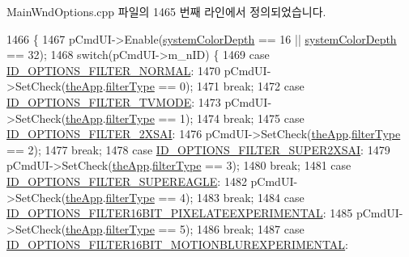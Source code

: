 Main\+Wnd\+Options.\+cpp 파일의 1465 번째 라인에서 정의되었습니다.


\begin{DoxyCode}
1466 \{
1467   pCmdUI->Enable(\mbox{\hyperlink{system_8cpp_adaf454a4617a00b5cfed14c203ab6efa}{systemColorDepth}} == 16 || \mbox{\hyperlink{system_8cpp_adaf454a4617a00b5cfed14c203ab6efa}{systemColorDepth}} == 32);
1468   \textcolor{keywordflow}{switch}(pCmdUI->m\_nID) \{
1469   \textcolor{keywordflow}{case} \mbox{\hyperlink{resource_8h_a25dffe1863840876df4f1a6115356a9a}{ID\_OPTIONS\_FILTER\_NORMAL}}:
1470     pCmdUI->SetCheck(\mbox{\hyperlink{_v_b_a_8cpp_a8095a9d06b37a7efe3723f3218ad8fb3}{theApp}}.\mbox{\hyperlink{class_v_b_a_a835f54f74420b21459e0f3ce0eacc20d}{filterType}} == 0);
1471     \textcolor{keywordflow}{break};
1472   \textcolor{keywordflow}{case} \mbox{\hyperlink{resource_8h_a16010f346f94112a47abf20452339c56}{ID\_OPTIONS\_FILTER\_TVMODE}}:
1473     pCmdUI->SetCheck(\mbox{\hyperlink{_v_b_a_8cpp_a8095a9d06b37a7efe3723f3218ad8fb3}{theApp}}.\mbox{\hyperlink{class_v_b_a_a835f54f74420b21459e0f3ce0eacc20d}{filterType}} == 1);
1474     \textcolor{keywordflow}{break};
1475   \textcolor{keywordflow}{case} \mbox{\hyperlink{resource_8h_a071863ea5c811c0e06f114a82a0dadab}{ID\_OPTIONS\_FILTER\_2XSAI}}:
1476     pCmdUI->SetCheck(\mbox{\hyperlink{_v_b_a_8cpp_a8095a9d06b37a7efe3723f3218ad8fb3}{theApp}}.\mbox{\hyperlink{class_v_b_a_a835f54f74420b21459e0f3ce0eacc20d}{filterType}} == 2);
1477     \textcolor{keywordflow}{break};
1478   \textcolor{keywordflow}{case} \mbox{\hyperlink{resource_8h_a86cc1c19f8454ac2cf99950637d3591f}{ID\_OPTIONS\_FILTER\_SUPER2XSAI}}:
1479     pCmdUI->SetCheck(\mbox{\hyperlink{_v_b_a_8cpp_a8095a9d06b37a7efe3723f3218ad8fb3}{theApp}}.\mbox{\hyperlink{class_v_b_a_a835f54f74420b21459e0f3ce0eacc20d}{filterType}} == 3);
1480     \textcolor{keywordflow}{break};
1481   \textcolor{keywordflow}{case} \mbox{\hyperlink{resource_8h_ad67d0cc174b31d83f60c7015545b3d52}{ID\_OPTIONS\_FILTER\_SUPEREAGLE}}:
1482     pCmdUI->SetCheck(\mbox{\hyperlink{_v_b_a_8cpp_a8095a9d06b37a7efe3723f3218ad8fb3}{theApp}}.\mbox{\hyperlink{class_v_b_a_a835f54f74420b21459e0f3ce0eacc20d}{filterType}} == 4);
1483     \textcolor{keywordflow}{break};
1484   \textcolor{keywordflow}{case} \mbox{\hyperlink{resource_8h_a5ba4548fe715791a996120215dcbffa8}{ID\_OPTIONS\_FILTER16BIT\_PIXELATEEXPERIMENTAL}}:
1485     pCmdUI->SetCheck(\mbox{\hyperlink{_v_b_a_8cpp_a8095a9d06b37a7efe3723f3218ad8fb3}{theApp}}.\mbox{\hyperlink{class_v_b_a_a835f54f74420b21459e0f3ce0eacc20d}{filterType}} == 5);
1486     \textcolor{keywordflow}{break};
1487   \textcolor{keywordflow}{case} \mbox{\hyperlink{resource_8h_a5d839edecfebb856488f6eebca043bc9}{ID\_OPTIONS\_FILTER16BIT\_MOTIONBLUREXPERIMENTAL}}:

\end{DoxyCode}
